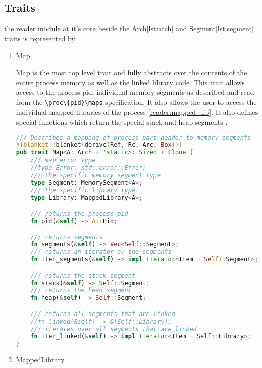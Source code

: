 \subsection{Traits}
the reader module at it's core beside the Arch\ref{lst:arch} and Segment\ref{lst:segment} traits is represented by:
\begin{enumerate}

    \item \label{reader:map}Map

Map is the most top level trait and fully abstracts over the contents of the entire process memory as well as the linked library code.
This trait allows access to the process pid, individual memory segments as described and read from the \verb|\proc\{pid}\maps| \cite{kerrisk_proc_pid_maps5_2024} specification.
It also allows the user to access the individual mapped libraries of the process \ref{reader:mapped_lib}.
It also defines special functions which return the special stack and heap segments \cite{TODO}.
    
\begin{lstlisting}[caption=\label{lst:map}"The Memory Map Trait definition", language=Rust]
 /// Describes a mapping of process part header to memory segments
#[blanket::blanket(derive(Ref, Rc, Arc, Box))]
pub trait Map<A: Arch + 'static>: Sized + Clone {
    /// map error type
    //type Error: std::error::Error;
    /// the specific memory segment type
    type Segment: MemorySegment<A>;
    /// the specific library type
    type Library: MappedLibrary<A>;

    /// returns the process pid
    fn pid(&self) -> A::Pid;

    /// returns segments
    fn segments(&self) -> Vec<Self::Segment>;
    /// returns an iterator ov the segments
    fn iter_segments(&self) -> impl Iterator<Item = Self::Segment>;

    /// returns the stack segment
    fn stack(&self) -> Self::Segment;
    /// returns the head segment
    fn heap(&self) -> Self::Segment;

    /// returns all segments that are linked
    //fn linked(&self) -> &[Self::Library];
    /// iterates over all segments that are linked
    fn iter_linked(&self) -> impl Iterator<Item = Self::Library>;
}   
\end{lstlisting}

 \item \label{reader:mapped_lib} MappedLibrary


\end{enumerate}
